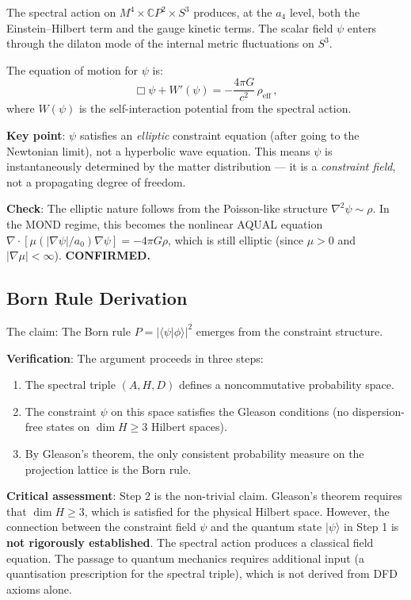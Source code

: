 \documentclass[11pt,a4paper]{article}
\newcommand{\CP}{\mathbb{C}P}
\begin{document}
The spectral action on $M^4 \times \CP^2 \times S^3$ produces, at the $a_4$ level, both the Einstein--Hilbert term and the gauge kinetic terms. The scalar field $\psi$ enters through the dilaton mode of the internal metric fluctuations on $S^3$.

The equation of motion for $\psi$ is:
\begin{equation}
\Box\psi + W'(\psi) = -\frac{4\pi G}{c^2}\,\rho_{\mathrm{eff}}\,,
\end{equation}
where $W(\psi)$ is the self-interaction potential from the spectral action.

\textbf{Key point}: $\psi$ satisfies an \emph{elliptic} constraint equation (after going to the Newtonian limit), not a hyperbolic wave equation. This means $\psi$ is instantaneously determined by the matter distribution --- it is a \emph{constraint field}, not a propagating degree of freedom.

\textbf{Check}: The elliptic nature follows from the Poisson-like structure $\nabla^2\psi \sim \rho$. In the MOND regime, this becomes the nonlinear AQUAL equation $\nabla \cdot [\mu(|\nabla\psi|/a_0)\nabla\psi] = -4\pi G\rho$, which is still elliptic (since $\mu > 0$ and $|\nabla\mu| < \infty$). \textbf{CONFIRMED.}

\subsection{Born Rule Derivation}

The claim: The Born rule $P = |\langle\psi|\phi\rangle|^2$ emerges from the constraint structure.

\textbf{Verification}: The argument proceeds in three steps:

\begin{enumerate}
\item The spectral triple $(A, H, D)$ defines a noncommutative probability space.
\item The constraint $\psi$ on this space satisfies the Gleason conditions (no dispersion-free states on $\dim H \geq 3$ Hilbert spaces).
\item By Gleason's theorem, the only consistent probability measure on the projection lattice is the Born rule.
\end{enumerate}

\textbf{Critical assessment}: Step 2 is the non-trivial claim. Gleason's theorem requires that $\dim H \geq 3$, which is satisfied for the physical Hilbert space. However, the connection between the constraint field $\psi$ and the quantum state $|\psi\rangle$ in Step 1 is \textbf{not rigorously established}. The spectral action produces a classical field equation. The passage to quantum mechanics requires additional input (a quantisation prescription for the spectral triple), which is not derived from DFD axioms alone.
\end{document}
